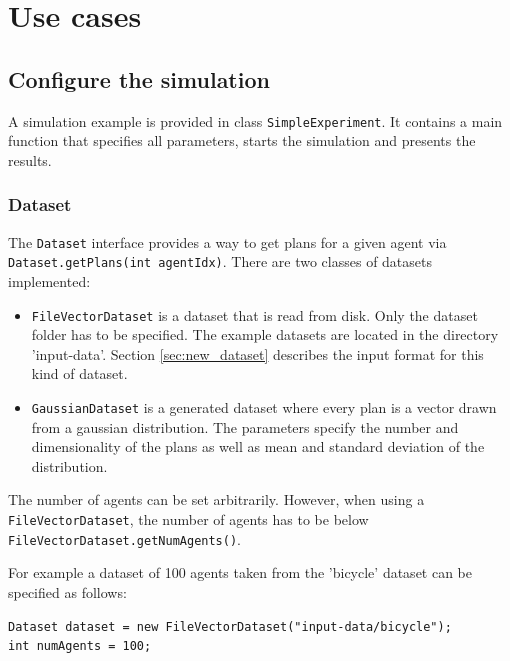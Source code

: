 \documentclass[11pt]{article} %
\newcommand{\code}{\texttt}
\begin{document}
\newpage
\section{Use cases}
\subsection{Configure the simulation}
A simulation example is provided in class \code{SimpleExperiment}. It contains a main function that specifies all parameters, starts the simulation and presents the results.

\subsubsection*{Dataset}
The \code{Dataset} interface provides a way to get plans for a given agent via \code{Dataset.getPlans(int agentIdx)}.
There are two classes of datasets implemented:
\begin{itemize}
	\item \code{FileVectorDataset} is a dataset that is read from disk. Only the dataset folder has to be specified. The example datasets are located in the directory 'input-data'. Section \ref{sec:new_dataset} describes the input format for this kind of dataset.
	\item \code{GaussianDataset} is a generated dataset where every plan is a vector drawn from a gaussian distribution. The parameters specify the number and dimensionality of the plans as well as mean and standard deviation of the distribution.
\end{itemize}
The number of agents can be set arbitrarily. However, when using a \code{FileVectorDataset}, the number of agents has to be below \code{FileVectorDataset.getNumAgents()}.

For example a dataset of 100 agents taken from the 'bicycle' dataset can be specified as follows:
\begin{verbatim}
Dataset dataset = new FileVectorDataset("input-data/bicycle");
int numAgents = 100;
\end{verbatim}
\end{document}
